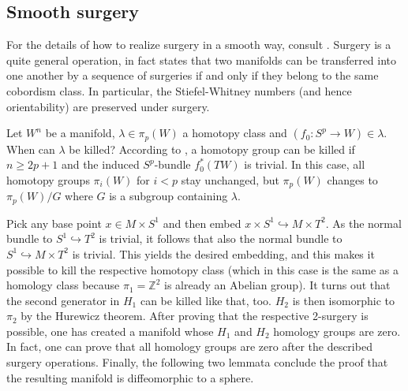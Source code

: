 
\subsection{Smooth surgery}
For the details of how to realize surgery in a smooth way, consult \cite[paragraph 1]{Milnor61}.
Surgery is a quite general operation, in fact \cite[Theorem 1]{Milnor61} states that two manifolds can be transferred 
into one another by a sequence of surgeries if and only if they belong to the same cobordism class.
In particular, the Stiefel-Whitney numbers (and hence orientability) are preserved under surgery.

Let $W^n$ be a manifold, $\lambda \in \pi_p(W)$ a homotopy class and $(f_0: S^p \to W)\in \lambda$. When can $\lambda$ be killed?
According to \cite[Lemma 3]{Milnor61}, a homotopy group can be killed if $n \geq 2p+1$ and the induced $S^p$-bundle $f_0^*(TW)$ is trivial.
In this case, all homotopy groups $\pi_i(W)$ for $i < p$ stay unchanged, but $\pi_p(W)$ changes to $\pi_p(W)/G$ where $G$ is a subgroup containing $\lambda$.

Pick any base point $x \in M \times S^1$ and then embed $x \times S^1 \hookrightarrow M \times T^2$.
As the normal bundle to $S^1 \hookrightarrow T^2$ is trivial, it follows that also the normal bundle to $S^1 \hookrightarrow M \times T^2$ is trivial.
This yields the desired embedding, and this makes it possible to kill the respective homotopy class 
(which in this case is the same as a homology class because $\pi_1 = \mathbb Z^2$ is already an Abelian group).
It turns out that the second generator in $H_1$ can be killed like that, too.
$H_2$ is then isomorphic to $\pi_2$ by the Hurewicz theorem.
After proving that the respective 2-surgery is possible, one has created a manifold whose $H_1$ and $H_2$ homology groups are zero.
In fact, one can prove that all homology groups are zero after the described surgery operations.
Finally, the following two lemmata conclude the proof that the resulting manifold is diffeomorphic to a sphere.

